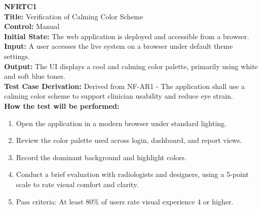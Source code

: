 \documentclass[12pt, titlepage]{article}
\begin{document}
\textbf{NFRTC1}\\
\textbf{Title:} Verification of Calming Color Scheme\\
\textbf{Control:} Manual\\
\textbf{Initial State:} The web application is deployed and accessible from a browser.\\
\textbf{Input:} A user accesses the live system on a browser under default theme settings.\\
\textbf{Output:} The UI displays a cool and calming color palette, primarily using white and soft blue tones.\\
\textbf{Test Case Derivation:} Derived from NF-AR1 - The application shall use a calming color scheme to support clinician usability and reduce eye strain.\\
\textbf{How the test will be performed:}
\begin{enumerate}
  \item Open the application in a modern browser under standard lighting.
  \item Review the color palette used across login, dashboard, and report views.
  \item Record the dominant background and highlight colors.
  \item Conduct a brief evaluation with radiologists and designers, using a 5-point scale to rate visual comfort and clarity.
  \item Pass criteria: At least 80\% of users rate visual experience 4 or higher.
\end{enumerate}

\vspace{1em}
\end{document}
